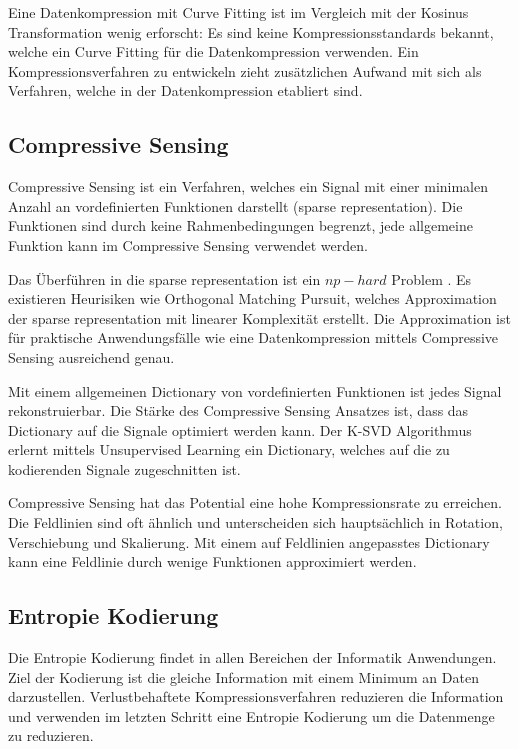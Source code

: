 Eine Datenkompression mit Curve Fitting ist im Vergleich mit der Kosinus Transformation wenig erforscht: Es sind keine Kompressionsstandards bekannt, welche ein Curve Fitting für die Datenkompression verwenden. Ein Kompressionsverfahren zu entwickeln zieht zusätzlichen Aufwand mit sich als Verfahren, welche in der Datenkompression etabliert sind.

\subsection{Compressive Sensing}
Compressive Sensing ist ein Verfahren, welches ein Signal mit einer minimalen Anzahl an vordefinierten Funktionen darstellt (sparse representation). Die Funktionen sind durch keine Rahmenbedingungen begrenzt, jede allgemeine Funktion kann im Compressive Sensing verwendet werden. 

Das Überführen in die sparse representation ist ein $np-hard$ Problem \cite{wiki:npHard}. Es existieren Heurisiken wie Orthogonal Matching Pursuit\cite{tropp2007signal}, welches Approximation der sparse representation mit linearer Komplexität erstellt. Die Approximation ist für praktische Anwendungsfälle wie eine Datenkompression mittels Compressive Sensing ausreichend genau.

Mit einem allgemeinen Dictionary von vordefinierten Funktionen ist jedes Signal rekonstruierbar. Die Stärke des Compressive Sensing Ansatzes ist, dass das Dictionary auf die Signale optimiert werden kann. Der K-SVD \cite{bryt2008compression} Algorithmus erlernt mittels Unsupervised Learning ein Dictionary, welches auf die zu kodierenden Signale zugeschnitten ist. 

Compressive Sensing hat das Potential eine hohe Kompressionsrate zu erreichen. Die Feldlinien sind oft ähnlich und unterscheiden sich hauptsächlich in Rotation, Verschiebung und Skalierung. Mit einem auf Feldlinien angepasstes Dictionary kann eine Feldlinie durch wenige Funktionen approximiert werden.

\subsection{Entropie Kodierung}
Die Entropie Kodierung findet in allen Bereichen der Informatik Anwendungen. Ziel der Kodierung ist die gleiche Information mit einem Minimum an Daten darzustellen. Verlustbehaftete Kompressionsverfahren reduzieren die Information und verwenden im letzten Schritt eine Entropie Kodierung um die Datenmenge zu reduzieren.

